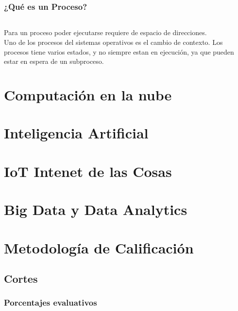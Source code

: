 \documentclass[a4paper]{report} %
\begin{document}
        \section{¿Qué es un Proceso?}
          \paragraph{}\mbox\\
            Para un proceso poder ejecutarse requiere de espacio de direcciones.
            \\Uno de los procesos del sistemas operativos es el cambio de contexto.
            Los procesos tiene varios estados, y no siempre estan en ejecución, ya que pueden estar en espera de un subproceso.



    \part{Computación en la nube}
    \part{Inteligencia Artificial}
    \part{IoT Intenet de las Cosas}
    \part{Big Data y Data Analytics}
    \part{Metodología de Calificación}
      \chapter{Cortes}
        \section{Porcentajes evaluativos}
\end{document}
